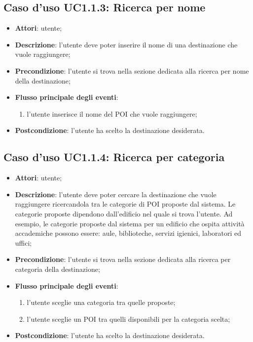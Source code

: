 \documentclass[../AnalisiDeiRequisiti.tex]{subfiles}
\begin{document}
\subsection{Caso d'uso UC1.1.3: Ricerca per nome}
\begin{itemize}
	\item \textbf{Attori}: utente;
	\item \textbf{Descrizione}: l'utente deve poter inserire il nome di una destinazione che vuole raggiungere; 
	\item \textbf{Precondizione}: l'utente si trova nella sezione dedicata alla ricerca per nome della destinazione;
	
	\item \textbf{Flusso principale degli eventi}:
	\begin{enumerate}
		\item l'utente inserisce il nome del POI che vuole raggiungere;
		
	\end{enumerate}
	\item \textbf{Postcondizione}: l'utente ha scelto la destinazione desiderata.
\end{itemize}
\hypertarget{UC1.1.4}{}
\subsection{Caso d'uso UC1.1.4: Ricerca per categoria}
\begin{itemize}
	\item \textbf{Attori}: utente;
	\item \textbf{Descrizione}: l'utente deve poter cercare la destinazione che vuole raggiungere ricercandola tra le categorie di POI proposte dal sistema. Le categorie proposte dipendono dall'edificio nel quale si trova l'utente. Ad esempio, le categorie proposte dal sistema per un edificio che ospita attività accademiche possono essere: aule, biblioteche, servizi igienici, laboratori ed uffici; 
	\item \textbf{Precondizione}: l'utente si trova nella sezione dedicata alla ricerca per categoria della destinazione;
	
	\item \textbf{Flusso principale degli eventi}:
	\begin{enumerate}
		\item l'utente sceglie una categoria tra quelle proposte;
		\item l'utente sceglie un POI tra quelli disponibili per la categoria scelta;
		
	\end{enumerate}
	\item \textbf{Postcondizione}: l'utente ha scelto la destinazione desiderata.
\end{itemize}
\hypertarget{UC1.1.5}{}
\end{document}
